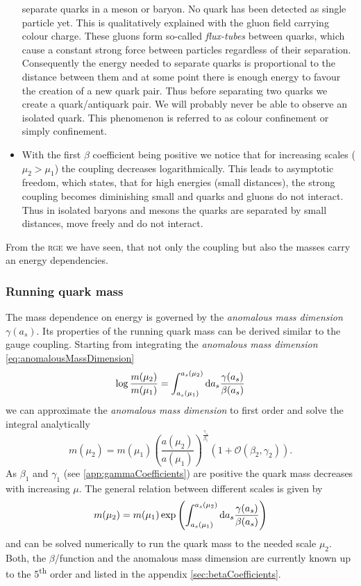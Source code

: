 \documentclass[../../index.tex]{subfiles}
\begin{document}
\begin{itemize}
  separate quarks in a meson or baryon. No quark has been detected as single
  particle yet. This is qualitatively explained with the gluon field carrying
  colour charge. These gluons form so-called \textit{flux-tubes} between quarks,
  which cause a constant strong force between particles regardless of their
  separation. Consequently the energy needed to separate quarks is proportional
  to the distance between them and at some point there is enough energy to
  favour the creation of a new quark pair. Thus before separating two quarks we
  create a quark\-/antiquark pair. We will probably never be able to
  observe an isolated quark. This phenomenon is referred to as colour
  confinement or simply confinement.
\item With the first \(\beta\) coefficient being positive we notice that for
  increasing scales (\(\mu_2>\mu_1\)) the coupling decreases logarithmically.
  This leads to asymptotic freedom, which states, that for high energies (small
  distances), the strong coupling becomes diminishing small and quarks and
  gluons do not interact. Thus in isolated baryons and mesons the quarks are
  separated by small distances, move freely and do not interact. \end{itemize}

From the \textsc{rge} we have seen, that not only the coupling but also the
masses carry an energy dependencies.

\subsubsection{Running quark mass}
The mass dependence on energy is governed by the \textit{anomalous mass
  dimension} \(\gamma(a_s)\). Its properties of the running quark mass can be
derived similar to the gauge coupling. Starting from integrating the
\textit{anomalous mass dimension} \cref{eq:anomalousMassDimension}
\begin{equation}
  \log \frac{m(\mu_2)}{m(\mu_1)} = \int_{a_s(\mu_1)}^{a_s(\mu_2)} \dif a_s \frac{\gamma(a_s)}{\beta(a_s)}
\end{equation}
we can approximate the \textit{anomalous mass dimension} to first order and
solve the integral analytically \cite{Schwab2002}
\begin{equation}
  m(\mu_2) = m(\mu_1)\left( \frac{a(\mu_2)}{a(\mu_1)} \right)^{\frac{\gamma_1}{\beta_1}} \left( 1 + \mathcal{O}(\beta_2, \gamma_2) \right).
\end{equation}
As \(\beta_1\) and \(\gamma_1\) (see \ref{app:gammaCoefficients}) are positive
the quark mass decreases with increasing \(\mu\). The general relation between
different scales is given by
\begin{equation}
  m(\mu_2) = m(\mu_1) \exp \left( \int_{a_s(\mu_1)}^{a_s(\mu_2)} \dif a_s \frac{\gamma(a_s)}{\beta(a_s)}  \right)
\end{equation}
and can be solved numerically to run the quark mass to the needed scale
\(\mu_2\). Both, the \(\beta\)\-/function and the anomalous mass dimension are
currently known up to the 5\textsuperscript{th} order and listed in the appendix
\ref{sec:betaCoefficients}.
\end{document}
